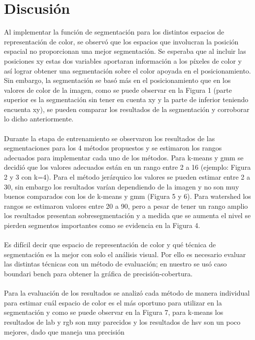 \documentclass[10pt,twocolumn,letterpaper]{article}
\begin{document}
\section{Discusión}

Al implementar la función de segmentación para los distintos espacios de representación de color, se observó que los espacios
que involucran la posición espacial no proporcionan una mejor segmentación. Se esperaba que al incluir las posiciones xy
estas dos variables aportaran información a los píxeles de color y así lograr obtener una segmentación sobre el color apoyada en el posicionamiento.
Sin embargo, la segmentación se basó más en el posicionamiento que en los valores de color de la imagen, como se puede observar en la Figura 1 
(parte superior es la segmentación sin tener en cuenta xy y la parte de inferior teniendo encuenta xy),
se pueden comparar los resultados de la segmentación y corroborar lo dicho anteriormente.
\\
\\
Durante la etapa de entrenamiento se observaron los resultados de las segmentaciones para los 4 métodos propuestos y se estimaron los 
rangos adecuados para implementar cada uno de los métodos. Para k-means y gmm se decidió que los valores adecuados están en un rango entre 2 a 16 (ejemplo: Figura 2 y 3 con k=4).
Para el método jerárquico los valores se pueden estimar entre 2 a 30, sin embargo los resultados varían dependiendo de la imagen y no son muy buenos comparados con los de k-means 
y gmm (Figura 5 y 6). Para watershed los rangos se estimaron valores entre 20 a 90, pero a pesar de tener un rango amplio los resultados presentan sobresegmentación y a medida que se aumenta el nivel se pierden segmentos 
importantes como se evidencia en la Figura 4. 
\\
\\
Es difícil decir que espacio de representación de color y qué técnica de segmentación es la mejor con solo el análisis visual.
Por ello es necesario evaluar las distintas técnicas con un método de evaluación; en nuestro se usó caso boundari bench para obtener la gráfica de 
precisión-cobertura.
\\
\\
Para la evaluación de los resultados se analizó cada método de manera individual para estimar cuál espacio de color es el más oportuno para utilizar en la segmentación
y como se puede observar en la Figura 7, para k-means los resultados de lab y rgb son muy parecidos y los resultados de hsv son un poco mejores, dado que maneja una precisión
\end{document}

